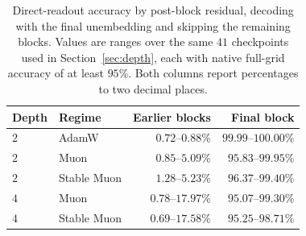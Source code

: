 \begin{table}[t]
\centering\small
\caption{Direct-readout accuracy by post-block residual, decoding with the final unembedding and
skipping the remaining blocks. Values are ranges over the same $41$ checkpoints used in
Section~\ref{sec:depth}, each with native full-grid accuracy of at least $95\%$. Both columns
report percentages to two decimal places.}
\label{tab:depthreadout}
\begin{tabular}{llrr}
\toprule
Depth & Regime & Earlier blocks & Final block \\
\midrule
$2$ & AdamW & $0.72$--$0.88\%$ & $99.99$--$100.00\%$ \\
$2$ & Muon & $0.85$--$5.09\%$ & $95.83$--$99.95\%$ \\
$2$ & Stable Muon & $1.28$--$5.23\%$ & $96.37$--$99.40\%$ \\
$4$ & Muon & $0.78$--$17.97\%$ & $95.07$--$99.30\%$ \\
$4$ & Stable Muon & $0.69$--$17.58\%$ & $95.25$--$98.71\%$ \\
\bottomrule
\end{tabular}
\end{table}

